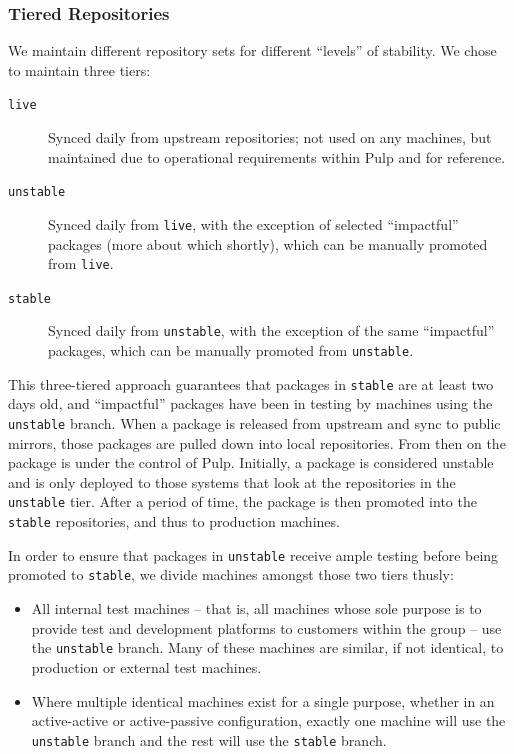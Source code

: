 \subsubsection{Tiered Repositories}

We maintain different repository sets for different ``levels'' of
stability.  We chose to maintain three tiers:

\begin{description}
\item[\texttt{live}] Synced daily from upstream repositories; not used
  on any machines, but maintained due to operational requirements
  within Pulp and for reference.
\item[\texttt{unstable}] Synced daily from \texttt{live}, with the
  exception of selected ``impactful'' packages (more about which
  shortly), which can be manually promoted from \texttt{live}.
\item[\texttt{stable}] Synced daily from \texttt{unstable}, with the
  exception of the same ``impactful'' packages, which can be manually
  promoted from \texttt{unstable}.
\end{description}

This three-tiered approach guarantees that packages in \texttt{stable}
are at least two days old, and ``impactful'' packages have been in
testing by machines using the \texttt{unstable} branch.  When a
package is released from upstream and sync to public mirrors, those
packages are pulled down into local repositories. From then on the
package is under the control of Pulp. Initially, a package is
considered unstable and is only deployed to those systems that look at
the repositories in the \texttt{unstable} tier. After a period of
time, the package is then promoted into the \texttt{stable}
repositories, and thus to production machines.

In order to ensure that packages in \texttt{unstable} receive ample
testing before being promoted to \texttt{stable}, we divide machines
amongst those two tiers thusly:

\begin{itemize}
\item All internal test machines -- that is, all machines whose sole
  purpose is to provide test and development platforms to customers
  within the group -- use the \texttt{unstable} branch.  Many of these
  machines are similar, if not identical, to production or external
  test machines.
\item Where multiple identical machines exist for a single purpose,
  whether in an active-active or active-passive configuration, exactly
  one machine will use the \texttt{unstable} branch and the rest will
  use the \texttt{stable} branch.
\end{itemize}


